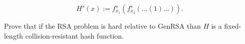 \documentclass{article}
\begin{document}
\begin{enumerate}
\begin{enumerate}
        \[
          H^s(x) := f_{x_1}^s(f_{x_2}^s(\dots(1)\dots)).
        \]

        Prove that if the RSA problem is hard relative to \textsf{GenRSA} than
        $H$ is a fixed-length collision-resistant hash function.
    \end{enumerate}
\end{enumerate}
\end{document}

